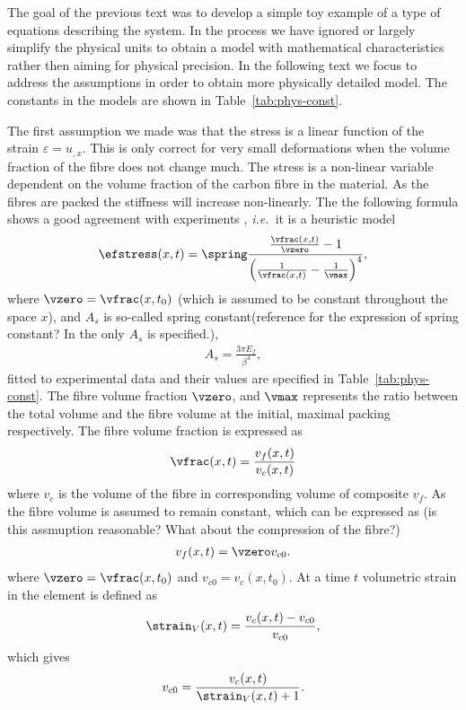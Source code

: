 \documentclass[twoside,a4paper,12pt,draft]{article}
\newcommand{\tabref}[1]{Table~\ref{#1}}
\newcommand{\ie}{{\it i.e.\ }}
\newcommand{\note}[1]{{\color{red}(#1)}}
\newcommand{\note}[1]{}
\begin{document}
The goal of the previous text was to develop a simple toy example of a
type of equations describing the system. In the process we have ignored
or largely simplify the physical units to obtain a model with
mathematical characteristics rather then aiming for physical
precision. In the following text we focus to address the assumptions
in order to obtain more physically detailed model. The constants in the
models are shown in \tabref{tab:phys-const}.

The first assumption we made was that the stress is a linear function
of the strain $\varepsilon = u_{,x}$. This is only correct for very
small deformations when the volume fraction of the fibre does not
change much.  The stress is a non-linear variable dependent on the
volume fraction of the carbon fibre in the material. As the fibres are
packed the stiffness will increase non-linearly. The the following
formula shows a good agreement with experiments \citet{Gutowski1987},
\ie it is a heuristic model
% 
\begin{align}
  \efstress(x,t) = \spring
  \frac{\frac{\vfrac(x,t)}{\vzero} -1}{\left(\frac{1}{\vfrac(x,t)} -\frac{1}{\vmax}\right)^4}, \label{eq:stress-nonlin}
\end{align}
%
where $\vzero = \vfrac(x,t_0)$ \note{which is assumed to be constant
  throughout the space $x$}, and $A_s$ is so-called spring
constant\note{reference for the expression of spring constant? In the
  \citet{Gutowski1987} only $A_s$ is specified.},
%
\begin{align}
  A_s = \frac{3\pi E_f}{\beta^4},
\end{align}
%
fitted to experimental data and their values are specified in
\tabref{tab:phys-const}.
%
The fibre volume fraction $\vzero$, and $\vmax$ represents the ratio
between the total volume and the fibre volume at the initial, maximal
packing respectively. The fibre volume fraction is expressed as
\begin{align}
  \vfrac(x,t) = \frac{v_f(x,t)}{v_c(x,t)}
\end{align}
%
where $v_c$ is the volume of the fibre in corresponding volume of
composite $v_f$. As the fibre volume is assumed to remain constant,
which can be expressed as
%
\note{is this assmuption reasonable? What about the compression of the fibre?}
%
\begin{align}
  v_f(x,t) = \vzero v_{c0}. \label{eq:fibre-fraction}
\end{align}
where $\vzero = \vfrac(x,t_0)$ and $v_{c0} = v_c(x,t_0)$.
%
At a time $t$ volumetric strain in the element is defined as
\begin{align}
  \strain_V(x,t) = \frac{v_c(x,t) - v_{c0}}{v_{c0}}, \label{eq:volumetric-strain}
\end{align}
which gives
%
\begin{align}
{v_{c0}}= \frac{v_c(x,t) }{\strain_V(x,t) + 1}. \label{eq:initial-volume}
\end{align}
\end{document}
